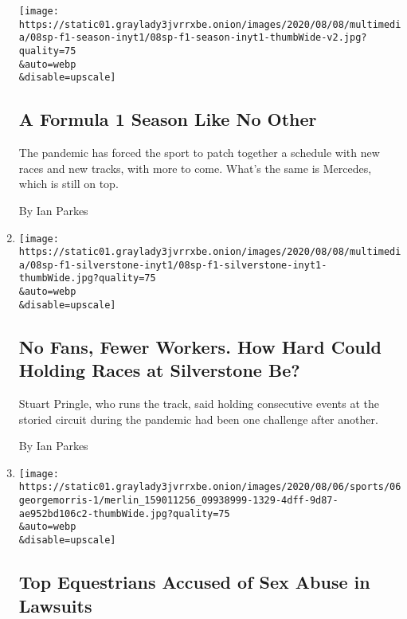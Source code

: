 \begin{enumerate}
  \texttt{[image: https://static01.graylady3jvrrxbe.onion/images/2020/08/08/multimedia/08sp-f1-season-inyt1/08sp-f1-season-inyt1-thumbWide-v2.jpg?quality=75\\\&auto=webp\\\&disable=upscale]}

  \hypertarget{a-formula-1-season-like-no-other}{%
  \subsection{A Formula 1 Season Like No
  Other}\label{a-formula-1-season-like-no-other}}

  The pandemic has forced the sport to patch together a schedule with
  new races and new tracks, with more to come. What's the same is
  Mercedes, which is still on top.

  By Ian Parkes
\item
  \href{/2020/08/07/sports/autoracing/formula-1-silverstone-pandemic.html}{}

  \texttt{[image: https://static01.graylady3jvrrxbe.onion/images/2020/08/08/multimedia/08sp-f1-silverstone-inyt1/08sp-f1-silverstone-inyt1-thumbWide.jpg?quality=75\\\&auto=webp\\\&disable=upscale]}

  \hypertarget{no-fans-fewer-workers-how-hard-could-holding-races-at-silverstone-be}{%
  \subsection{No Fans, Fewer Workers. How Hard Could Holding Races at
  Silverstone
  Be?}\label{no-fans-fewer-workers-how-hard-could-holding-races-at-silverstone-be}}

  Stuart Pringle, who runs the track, said holding consecutive events at
  the storied circuit during the pandemic had been one challenge after
  another.

  By Ian Parkes
\item
  \href{/2020/08/06/sports/equestrian-sexual-abuse-george-morris.html}{}

  \texttt{[image: https://static01.graylady3jvrrxbe.onion/images/2020/08/06/sports/06georgemorris-1/merlin\_159011256\_09938999-1329-4dff-9d87-ae952bd106c2-thumbWide.jpg?quality=75\\\&auto=webp\\\&disable=upscale]}

  \hypertarget{top-equestrians-accused-of-sex-abuse-in-lawsuits}{%
  \subsection{Top Equestrians Accused of Sex Abuse in
  Lawsuits}\label{top-equestrians-accused-of-sex-abuse-in-lawsuits}}


\end{enumerate}
